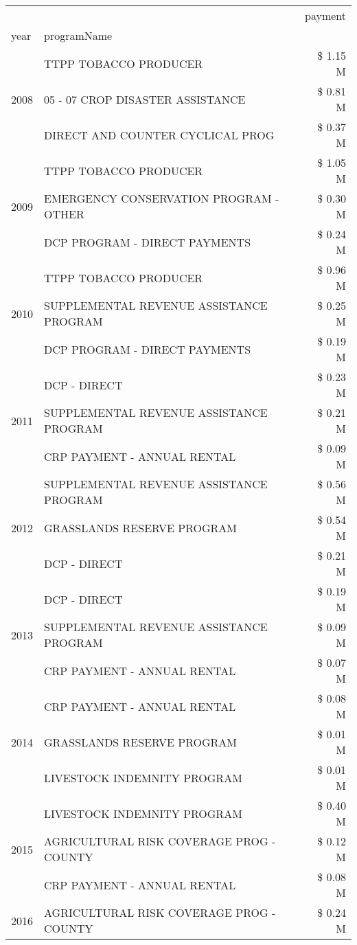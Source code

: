 \begin{tabular}{llr}
\toprule
 &  & payment \\
year & programName &  \\
\midrule
\multirow[t]{3}{*}{2008} & TTPP TOBACCO PRODUCER & \$ 1.15 M \\
 & 05 - 07 CROP DISASTER ASSISTANCE & \$ 0.81 M \\
 & DIRECT AND COUNTER CYCLICAL PROG & \$ 0.37 M \\
\cline{1-3}
\multirow[t]{3}{*}{2009} & TTPP TOBACCO PRODUCER & \$ 1.05 M \\
 & EMERGENCY CONSERVATION PROGRAM - OTHER & \$ 0.30 M \\
 & DCP PROGRAM - DIRECT PAYMENTS & \$ 0.24 M \\
\cline{1-3}
\multirow[t]{3}{*}{2010} & TTPP TOBACCO PRODUCER & \$ 0.96 M \\
 & SUPPLEMENTAL REVENUE ASSISTANCE PROGRAM & \$ 0.25 M \\
 & DCP PROGRAM - DIRECT PAYMENTS & \$ 0.19 M \\
\cline{1-3}
\multirow[t]{3}{*}{2011} & DCP - DIRECT & \$ 0.23 M \\
 & SUPPLEMENTAL REVENUE ASSISTANCE PROGRAM & \$ 0.21 M \\
 & CRP PAYMENT - ANNUAL RENTAL & \$ 0.09 M \\
\cline{1-3}
\multirow[t]{3}{*}{2012} & SUPPLEMENTAL REVENUE ASSISTANCE PROGRAM & \$ 0.56 M \\
 & GRASSLANDS RESERVE PROGRAM & \$ 0.54 M \\
 & DCP - DIRECT & \$ 0.21 M \\
\cline{1-3}
\multirow[t]{3}{*}{2013} & DCP - DIRECT & \$ 0.19 M \\
 & SUPPLEMENTAL REVENUE ASSISTANCE PROGRAM & \$ 0.09 M \\
 & CRP PAYMENT - ANNUAL RENTAL & \$ 0.07 M \\
\cline{1-3}
\multirow[t]{3}{*}{2014} & CRP PAYMENT - ANNUAL RENTAL & \$ 0.08 M \\
 & GRASSLANDS RESERVE PROGRAM & \$ 0.01 M \\
 & LIVESTOCK INDEMNITY PROGRAM & \$ 0.01 M \\
\cline{1-3}
\multirow[t]{3}{*}{2015} & LIVESTOCK INDEMNITY PROGRAM & \$ 0.40 M \\
 & AGRICULTURAL RISK COVERAGE PROG - COUNTY & \$ 0.12 M \\
 & CRP PAYMENT - ANNUAL RENTAL & \$ 0.08 M \\
\cline{1-3}
\multirow[t]{3}{*}{2016} & AGRICULTURAL RISK COVERAGE PROG - COUNTY & \$ 0.24 M \\

\end{tabular}

